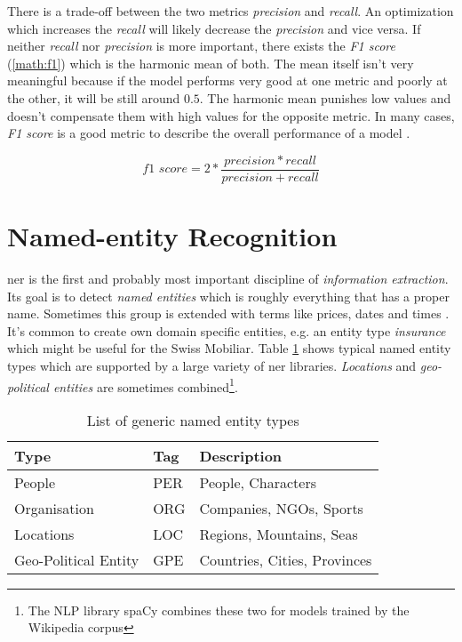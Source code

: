 There is a trade-off between the two metrics \emph{precision} and \emph{recall}. An optimization which increases the \emph{recall}
will likely decrease the \emph{precision} and vice versa. If neither \emph{recall} nor \emph{precision} is more important, there
exists the \emph{F1 score} (\ref{math:f1}) which is the harmonic mean of both. The mean itself isn't very meaningful because if the
model performs very good at one metric and poorly at the other, it will be still around $0.5$. The harmonic mean punishes low values
and doesn't compensate them with high values for the opposite metric. In many cases, \emph{F1 score} is a good metric to describe the
overall performance of a model \cite{Grus15}.

\begin{equation}
    \label{math:f1}
    \textit{f1 score} = 2 * \frac{precision * recall}{precision + recall}
\end{equation}

\section{Named-entity Recognition}

\acrfull{ner} is the first and probably most important discipline of \emph{information extraction}. Its goal is to detect
\emph{named entities} which is roughly everything that has a proper name. Sometimes this group is extended with terms like prices,
dates and times \cite{Jurafsky2000}. It's common to create own domain specific entities, e.g. an entity type \emph{insurance} which
might be useful for the Swiss Mobiliar. Table \ref{tbl:named-entities} shows typical named entity types which are supported by a
large variety of \acrshort{ner} libraries. \emph{Locations} and \emph{geo-political entities} are sometimes combined\footnote{The NLP
library spaCy combines these two for models trained by the Wikipedia corpus}.

\begin{table}[h!]
    \centering
    \begin{tabular}{|l|l|l|}
        \hline
        \textbf{Type} & \textbf{Tag} & \textbf{Description} \\ [0.5ex]
        \hline
        People & PER & People, Characters \\
        Organisation & ORG & Companies, NGOs, Sports \\
        Locations & LOC & Regions, Mountains, Seas \\
        Geo-Political Entity & GPE & Countries, Cities, Provinces \\ [1ex]
        \hline
    \end{tabular}
    \caption{List of generic named entity types}
    \label{tbl:named-entities}
\end{table}

